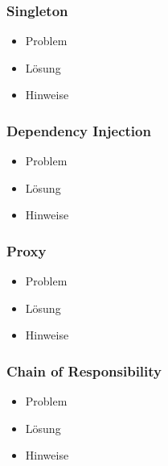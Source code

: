 \documentclass[../ZF_SWEN1.tex]{subfiles}
\begin{document}
\subsubsection{Singleton}
\begin{itemize}
	\item Problem
	\item Lösung
	\item Hinweise
\end{itemize}



\subsubsection{Dependency Injection}
\begin{itemize}
	\item Problem
	\item Lösung
	\item Hinweise
\end{itemize}




\subsubsection{Proxy}
\begin{itemize}
	\item Problem
	\item Lösung
	\item Hinweise
\end{itemize}


\subsubsection{Chain of Responsibility}
\begin{itemize}
	\item Problem
	\item Lösung
	\item Hinweise
\end{itemize}
\end{document}
